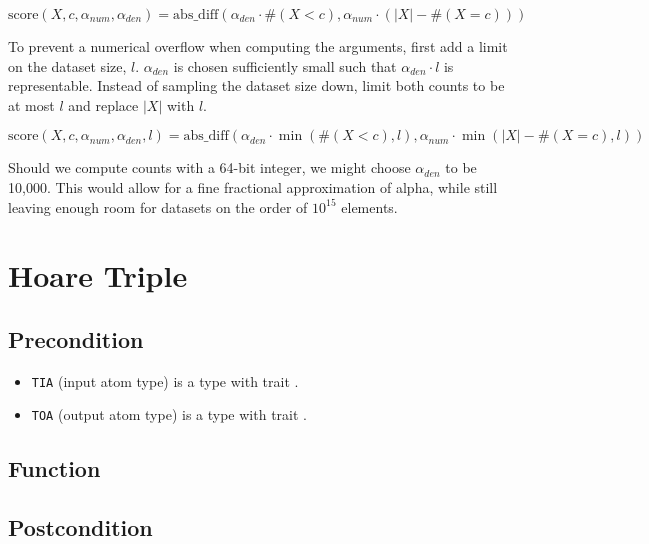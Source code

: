 \documentclass{article}
\begin{document}
\begin{equation}
    \textrm{score}(X, c, \alpha_{num}, \alpha_{den}) = \mathrm{abs\_diff}(\alpha_{den} \cdot \#(X < c), \alpha_{num} \cdot (|X| - \#(X = c)))
\end{equation}

To prevent a numerical overflow when computing the arguments, first add a limit on the dataset size, $l$.
$\alpha_{den}$ is chosen sufficiently small such that $\alpha_{den} \cdot l$ is representable.
Instead of sampling the dataset size down, limit both counts to be at most $l$ and replace $|X|$ with $l$.

\begin{equation}
    \textrm{score}(X, c, \alpha_{num}, \alpha_{den}, l) = \mathrm{abs\_diff}(\alpha_{den} \cdot \min(\#(X < c), l), \alpha_{num} \cdot \min(|X| - \#(X = c), l))
\end{equation}

Should we compute counts with a 64-bit integer, we might choose $\alpha_{den}$ to be 10,000.
This would allow for a fine fractional approximation of alpha,
while still leaving enough room for datasets on the order of $10^{15}$ elements.

\section{Hoare Triple}
\subsection*{Precondition}
\begin{itemize}
    \item \texttt{TIA} (input atom type) is a type with trait .
    \item \texttt{TOA} (output atom type) is a type with trait .
\end{itemize}


\subsection*{Function}
\label{sec:python-pseudocode}



\subsection*{Postcondition}
\end{document}
